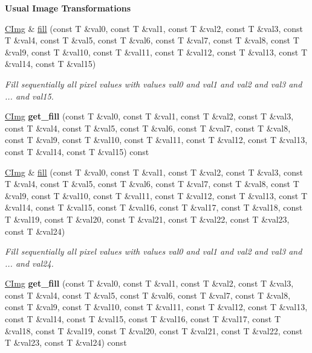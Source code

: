 \begin{Indent}{\bf Usual Image Transformations}
\begin{DoxyCompactItemize}
\item 
\hyperlink{structcimg__library_1_1_c_img}{CImg} \& \hyperlink{structcimg__library_1_1_c_img_a9b0a6c3b5a07ada1d9f278ddf40239ef}{fill} (const T \&val0, const T \&val1, const T \&val2, const T \&val3, const T \&val4, const T \&val5, const T \&val6, const T \&val7, const T \&val8, const T \&val9, const T \&val10, const T \&val11, const T \&val12, const T \&val13, const T \&val14, const T \&val15)
\begin{DoxyCompactList}\small\item\em Fill sequentially all pixel values with values {\itshape val0\/} and {\itshape val1\/} and {\itshape val2\/} and {\itshape val3\/} and {\itshape \/}... and {\itshape val15\/}. \item\end{DoxyCompactList}\item 
\hypertarget{structcimg__library_1_1_c_img_a2aa569bb0fbff6d2d49fe70bd3abfda6}{
\hyperlink{structcimg__library_1_1_c_img}{CImg} {\bfseries get\_\-fill} (const T \&val0, const T \&val1, const T \&val2, const T \&val3, const T \&val4, const T \&val5, const T \&val6, const T \&val7, const T \&val8, const T \&val9, const T \&val10, const T \&val11, const T \&val12, const T \&val13, const T \&val14, const T \&val15) const }
\label{structcimg__library_1_1_c_img_a2aa569bb0fbff6d2d49fe70bd3abfda6}

\item 
\hyperlink{structcimg__library_1_1_c_img}{CImg} \& \hyperlink{structcimg__library_1_1_c_img_a2b82a0ea0a71d2a448f53c76a06932b5}{fill} (const T \&val0, const T \&val1, const T \&val2, const T \&val3, const T \&val4, const T \&val5, const T \&val6, const T \&val7, const T \&val8, const T \&val9, const T \&val10, const T \&val11, const T \&val12, const T \&val13, const T \&val14, const T \&val15, const T \&val16, const T \&val17, const T \&val18, const T \&val19, const T \&val20, const T \&val21, const T \&val22, const T \&val23, const T \&val24)
\begin{DoxyCompactList}\small\item\em Fill sequentially all pixel values with values {\itshape val0\/} and {\itshape val1\/} and {\itshape val2\/} and {\itshape val3\/} and {\itshape \/}... and {\itshape val24\/}. \item\end{DoxyCompactList}\item 
\hypertarget{structcimg__library_1_1_c_img_a10f42108ee33321b915e6c35838aae20}{
\hyperlink{structcimg__library_1_1_c_img}{CImg} {\bfseries get\_\-fill} (const T \&val0, const T \&val1, const T \&val2, const T \&val3, const T \&val4, const T \&val5, const T \&val6, const T \&val7, const T \&val8, const T \&val9, const T \&val10, const T \&val11, const T \&val12, const T \&val13, const T \&val14, const T \&val15, const T \&val16, const T \&val17, const T \&val18, const T \&val19, const T \&val20, const T \&val21, const T \&val22, const T \&val23, const T \&val24) const }
\label{structcimg__library_1_1_c_img_a10f42108ee33321b915e6c35838aae20}


\end{DoxyCompactItemize}
\end{Indent}
